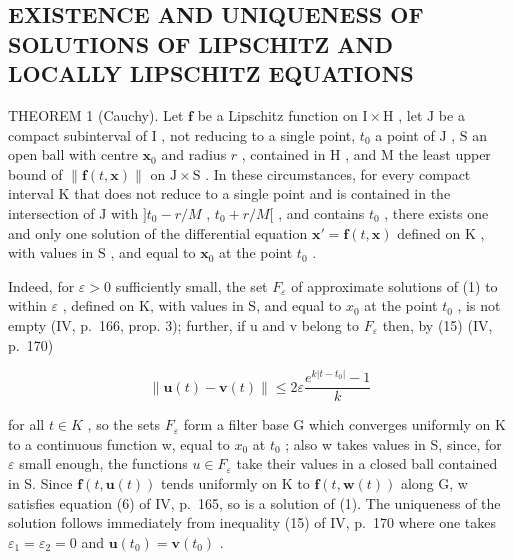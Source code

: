 \subsection{EXISTENCE AND UNIQUENESS OF SOLUTIONS OF LIPSCHITZ AND LOCALLY LIPSCHITZ EQUATIONS}

THEOREM 1 (Cauchy). Let \(\mathbf{f}\) be a Lipschitz function on \(\mathrm{I} \times \mathrm{H}\) , let \(\mathrm{J}\) be a compact subinterval of \(\mathrm{I}\) , not reducing to a single point, \(t_0\) a point of \(\mathrm{J}\) , \(\mathrm{S}\) an open ball with centre \(\mathbf{x}_0\) and radius \(r\) , contained in \(\mathrm{H}\) , and \(\mathrm{M}\) the least upper bound of \(\| \mathbf{f}(t, \mathbf{x})\|\) on \(\mathrm{J} \times \mathrm{S}\) . In these circumstances, for every compact interval \(\mathrm{K}\) that does not reduce to a single point and is contained in the intersection of \(\mathrm{J}\) with \(]t_0 - r / M\) , \(t_0 + r / M[\) , and contains \(t_0\) , there exists one and only one solution of the differential equation \(\mathbf{x}' = \mathbf{f}(t, \mathbf{x})\) defined on \(\mathrm{K}\) , with values in \(\mathrm{S}\) , and equal to \(\mathbf{x}_0\) at the point \(t_0\) .

Indeed, for \(\varepsilon > 0\) sufficiently small, the set \(F_{\varepsilon}\) of approximate solutions of (1) to within \(\varepsilon\) , defined on K, with values in S, and equal to \(x_{0}\) at the point \(t_{0}\) , is not empty (IV, p.~166, prop. 3); further, if u and v belong to \(F_{\varepsilon}\) then, by (15) (IV, p.~170)

\[
\| \mathbf {u} (t) - \mathbf {v} (t) \| \leqslant 2 \varepsilon \frac {e ^ {k | t - t _ {0} |} - 1}{k}
\]

for all \(t \in K\) , so the sets \(F_{\varepsilon}\) form a filter base G which converges uniformly on K to a continuous function w, equal to \(x_{0}\) at \(t_{0}\) ; also w takes values in S, since, for \(\varepsilon\) small enough, the functions \(u \in F_{\varepsilon}\) take their values in a closed ball contained in S. Since \(\mathbf{f}(t, \mathbf{u}(t))\) tends uniformly on K to \(\mathbf{f}(t, \mathbf{w}(t))\) along G, w satisfies equation (6) of IV, p.~165, so is a solution of (1). The uniqueness of the solution follows immediately from inequality (15) of IV, p.~170 where one takes \(\varepsilon_{1} = \varepsilon_{2} = 0\) and \(\mathbf{u}(t_{0}) = \mathbf{v}(t_{0})\) .

